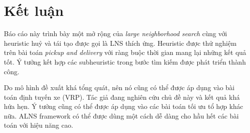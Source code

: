 \chapter{Kết luận}
Báo cáo này trình bày một mở rộng của \textit{large neighborhood search} cùng với heuristic huỷ và tái tạo được gọi là LNS thích ứng. Heuristic được thử nghiệm trên bài toán \textit{pickup and delivery} với ràng buộc thời gian mang lại những kết quả tốt. Ý tưởng kết hợp các subheuristic trong bước tìm kiếm được phát triển thành công. 

Do mô hình đề xuất khá tổng quát, nên nó cũng có thể được áp dụng vào bài toán định tuyến xe (VRP). Tác giả đang nghiên cứu chủ đề này và kết quả khá hứa hẹn. Ý tưởng cũng có thể được áp dụng vào các bài toán tối ưu tổ hợp khác nữa. ALNS framework có thể được dùng một cách dễ dàng cho hầu hết các bài toán với hiệu năng cao. 
